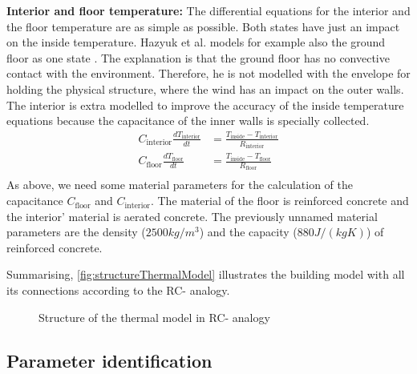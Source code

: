     \textbf{Interior and floor temperature:}\newline
    The differential equations for the interior and the floor temperature are as simple as possible. Both states have just an impact on the inside temperature. 
    Hazyuk et al. models for example also the ground floor as one state \cite{Hazyuk.2012}. The explanation is that the ground floor has no convective contact with the environment. Therefore, he is not modelled with the envelope for holding the physical structure, where the wind has an impact on the outer walls.
    The interior is extra modelled to improve the accuracy of the inside temperature equations because the capacitance of the inner walls is specially collected.
    \begin{align}
    C_\text{interior} \frac{d T_\text{interior}}{d t} &= \frac{T_\text{inside}-T_\text{interior}}{R_\text{interior}} \\
       C_\text{floor} \frac{d T_\text{floor}}{d t} &= \frac{T_\text{inside}-T_\text{floor}}{R_\text{floor}} \nonumber\\
    \end{align}
    As above, we need some material parameters for the calculation of the capacitance $C_\text{floor}$ and $C_\text{interior}$. The material of the floor is reinforced concrete and the interior' material is aerated concrete. The previously unnamed material parameters are the density ($2500 kg/m^3$) \cite{AntonSchweizer.12.10.2021} and the capacity ($880 J/(kg K)$) \cite{AntonSchweizer.12.10.2021b} of reinforced concrete.\newline
     
    Summarising, \autoref{fig:structureThermalModel} illustrates the building model with all its connections according to the RC- analogy.
    \begin{figure}
            \centering
            \def\svgwidth{410pt}
            
            \caption{Structure of the thermal model in RC- analogy}
            \label{fig:structureThermalModel}
        \end{figure}
        
    \subsection{Parameter identification}
    \label{WorkflowModel}
    
